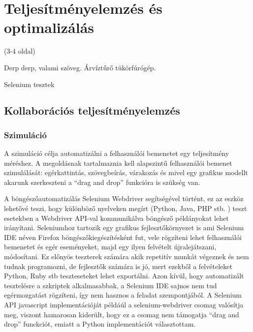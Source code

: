 \chapter{Teljesítményelemzés és optimalizálás}

(3-4 oldal)

Derp derp, valami szöveg. Árvíztűrő tükörfúrógép.

Selenium tesztek


\section{Kollaborációs teljesítményelemzés}


\subsection{Szimuláció}
\label{sec:simprof}

A szimuláció célja automatizálni a felhasználói bemenetet egy teljesítmény méréshez. A megoldásnak tartalmaznia kell alapszintű felhasználói bemenet szimulálását: egérkattintás, szövegbeírás, várakozás és mivel egy grafikus modellt akarunk szerkeszteni a ``drag and drop'' funkcióra is szükség van. 

A böngészőautomatizálás Selenium Webdriver segítségével történt, ez az eszköz lehetővé teszi, hogy különböző nyelveken megírt (Python, Java, PHP stb. ) teszt esetekben a Webdriver API-val kommunikálva böngésző példányokat lehet irányítani. 
Seleniumhoz tartozik egy grafikus fejlesztőkörnyezet is ami Selenium IDE néven Firefox böngészőkiegészítésként fut, vele rögzíteni lehet felhasználói bemenetet és egér eseményeket, majd egy ilyen felvételt újralejátszani, módosítani. Ez előnyös teszterek számára akik repetitív munkát végeznek és nem tudnak programozni, de fejlesztők számára is jó, mert ezekből a felvételeket Python, Ruby stb teszteseteket lehet exportálni. 
Azon kívül, hogy automatizált tesztelésre a szkriptek alkalmasabbak, a Selenium IDE sajnos nem tud egérmozgatást rögzíteni, így nem hasznos a feladat szempontjából. A Selenium API javascript implementációját példáúl a selenium-webdriver csomag valósítja meg, viszont hamarosan kiderült, hogy ez a csomag nem támogatja ``drag and drop'' funckciót, emiatt a Python implementációt választottam. 

